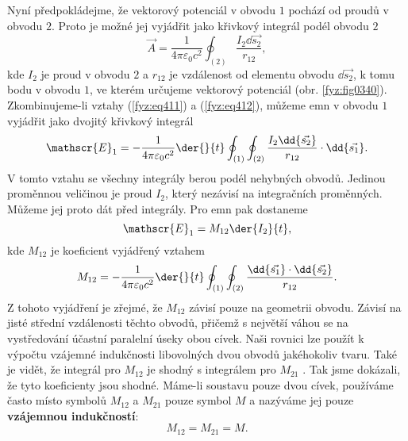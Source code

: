  Nyní předpokládejme, že vektorový potenciál v obvodu \(1\) pochází od proudů v obvodu \(2\). 
  Proto je možné jej vyjádřit jako křivkový integrál podél obvodu \(2\)
  \begin{equation}\label{fyz:eq412}
    \vec{A} = \frac{1}{4\pi\varepsilon_0c^2}\oint_{(2)}\frac{I_2\dd{\vec{s_2}}}{r_{12}},
  \end{equation}
  kde \(I_2\) je proud v obvodu \(2\) a \(r_{12}\) je vzdálenost od elementu obvodu 
  \(\dd\vec{s_2}\), k tomu bodu v obvodu \(1\), ve kterém určujeme vektorový potenciál (obr. 
  \ref{fyz:fig0340}). Zkombinujeme-li vztahy (\ref{fyz:eq411}) a (\ref{fyz:eq412}), můžeme emn v 
  obvodu \(1\) vyjádřit jako dvojitý křivkový integrál
  \begin{equation}\label{fyz:eq413}
    \mathscr{E}_1 = - \frac{1}{4\pi\varepsilon_0c^2}\der{ }{t}
                    \oint_{(1)}\oint_{(2)}\frac{I_2\dd{\vec{s_2}}}{r_{12}}\cdot\dd{\vec{s_1}}.
  \end{equation}
  V tomto vztahu se všechny integrály berou podél nehybných obvodů. Jedinou proměnnou veličinou je 
  proud \(I_2\), který nezávisí na integračních proměnných. Můžeme jej proto dát před
  integrály. Pro emn pak dostaneme 
  \begin{equation*}
    \mathscr{E}_1 = M_{12}\der{I_2}{t},
  \end{equation*}
  kde \(M_{12}\) je koeficient vyjádřený vztahem
  \begin{equation}\label{fyz:eq414}
    M_{12} = - \frac{1}{4\pi\varepsilon_0c^2}\der{ }{t}
             \oint_{(1)}\oint_{(2)}\frac{\dd{\vec{s_1}}\cdot\dd{\vec{s_2}}}{r_{12}}.
  \end{equation}
  Z tohoto vyjádření je zřejmé, že \(M_{12}\)  závisí pouze na geometrii obvodu. Závisí na jisté 
  střední vzdálenosti těchto obvodů, přičemž s největší váhou se na vystředování účastní paralelní 
  úseky obou cívek. Naši rovnici lze použít k výpočtu vzájemné indukčnosti libovolných dvou obvodů
  jakéhokoliv tvaru. Také je vidět, že integrál pro \(M_{12}\)  je shodný s integrálem pro 
  \(M_{21}\) . Tak jsme dokázali, že tyto koeficienty jsou shodné. Máme-li soustavu pouze dvou 
  cívek, používáme často místo symbolů \(M_{12}\) a \(M_{21}\)  pouze symbol \(M\) a nazýváme jej 
  pouze \textbf{vzájemnou indukčností}:
  \begin{equation*}
    M_{12} =  M_{21} = M.
  \end{equation*}
  
